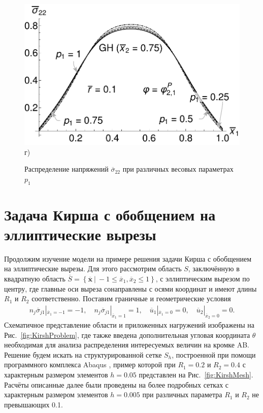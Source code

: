 \begin{figure}[ht]
\begin{minipage}[b][][b]{0.49\linewidth}
        \includegraphics[width=\linewidth]{pics/TStressGH.pdf} \\ г)
    \end{minipage}
    \caption{Распределение напряжений $\overline{\sigma}_{22}$ при различных весовых параметрах $p_1$}
    \label{fig:TSigma}
\end{figure}

\section{Задача Кирша с обобщением на эллиптические вырезы}\label{sec:ResultsAnalysis/KirshProblem}

Продолжим изучение модели на примере решения задачи Кирша с обобщением на эллиптические вырезы. Для этого рассмотрим область $S$, заключённую в квадратную область $\overline{S} = \left\{ \boldsymbol{\overline{x}} \ | \ -1 \leqslant \overline{x}_1, \overline{x}_2 \leqslant 1 \right\}$, с эллиптическим вырезом по центру, где главные оси выреза сонаправлены с осями координат и имеют длины $R_1$ и $R_2$ соответственно. Поставим граничные и геометрические условия
\begin{gather*}
	n_j \overline{\sigma}_{j1} |_{\overline{x}_1 = -1} = -1,
	\quad
	n_j \overline{\sigma}_{j1} |_{\overline{x}_1 = 1} = 1,
	\quad
	\overline{u}_1 |_{\overline{x}_1 = 0} = 0,
	\quad
	\overline{u}_2 |_{\overline{x}_2 = 0} = 0.
\end{gather*}
Схематичное представление области и приложенных нагружений изображены на Рис.~\ref{fig:KirshProblem}, где также введена дополнительная угловая координата $\theta$ необходимая для анализа распределения интересуемых величин на кромке AB. Решение будем искать на структурированной сетке $S_h$, построенной при помощи программного комплекса Abaqus \cite{Abaqus}, пример которой при $R_1 = 0.2$ и $R_2 = 0.4$ с характерным размером элементов $h = 0.05$ представлен на Рис.~\ref{fig:KirshMesh}. Расчёты описанные далее были проведены на более подробных сетках с характерным размером элементов $h = 0.005$ при различных параметра $R_1$ и $R_2$ не превышающих 0.1.

